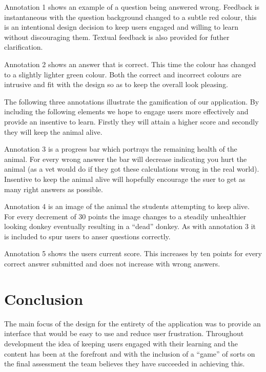 \documentclass{l3proj}
\begin{document}
Annotation 1 shows an example of a question being answered wrong. Feedback is instantaneous with the question background changed to a subtle red colour, this is an intentional design decision to keep users engaged and willing to learn without discouraging them. Textual feedback is also provided for futher clarification. 

Annotation 2 shows an answer that is correct. This time the colour has changed to a slightly lighter green colour. Both the correct and incorrect colours are intrusive and fit with the design so as to keep the overall look pleasing.

The following three annotations illustrate the gamification of our application. By including the following elements we hope to engage users more effectively and provide an insentive to learn. Firstly they will attain a higher score and secondly they will keep the animal alive.

Annotation 3 is a progress bar which portrays the remaining health of the animal. For every wrong answer the bar will decrease indicating you hurt the animal (as a vet would do if they got these calculations wrong in the real world). Insentive to keep the animal alive will hopefully encourage the suer to get as many right answers as possible.

Annotation 4 is an image of the animal the students attempting to keep alive. For every decrement of 30 points the image changes to a steadily unhealthier looking donkey eventually resulting in a ``dead'' donkey. As with annotation 3 it is included to spur users to anser questions correctly.

Annotation 5 shows the users current score. This increases by ten points for every correct answer submitted and does not increase with wrong answers. 

\section{Conclusion}

The main focus of the design for the entirety of the application was to provide an interface that would be easy to use and reduce user frustration. Throughout development the idea of keeping users engaged with their learning and the content has been at the forefront and with the inclusion of a ``game'' of sorts on the final assessment the team believes they have succeeded in achieving this.
\end{document}
